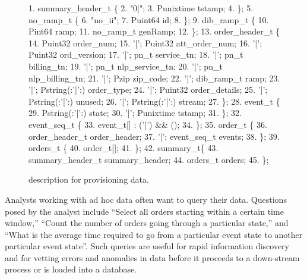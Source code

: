 \begin{figure}
\begin{small}
\begin{code}
{ 1}.   summary\_header\_t \{
{ 2}.  "0|";
{ 3}.  Punixtime tstamp;
{ 4}. \};
\mbox{}
{ 5}.  no\_ramp\_t \{
{ 6}.  "no\_ii";
{ 7}.  Puint64 id;
{ 8}. \};
\mbox{}
{ 9}.  dib\_ramp\_t \{
{10}.   Pint64     ramp;
{11}.   no\_ramp\_t  genRamp;
{12}. \};
\mbox{}
{13}.  order\_header\_t \{
{14}.        Puint32             order\_num;
{15}.  '|';  Puint32             att\_order\_num;
{16}.  '|';  Puint32             ord\_version;
{17}.  '|';   pn\_t           service\_tn;
{18}.  '|';   pn\_t           billing\_tn;
{19}.  '|';   pn\_t           nlp\_service\_tn;
{20}.  '|';   pn\_t           nlp\_billing\_tn;
{21}.  '|';   Pzip           zip\_code;
{22}.  '|';  dib\_ramp\_t          ramp;
{23}.  '|';  Pstring(:'|':)      order\_type;
{24}.  '|';  Puint32             order\_details;
{25}.  '|';  Pstring(:'|':)      unused;
{26}.  '|';  Pstring(:'|':)      stream;
{27}. \};
\mbox{}
{28}.  event\_t \{
{29}.        Pstring(:'|':)    state;   
{30}.   '|'; Punixtime         tstamp;
{31}. \};
\mbox{}
{32}.  event\_seq\_t \{
{33}.   event\_t[] : ('|') && ();
{34}. \};
\mbox{}
{35}.   order\_t \{
{36}.        order\_header\_t  order\_header;
{37}.   '|'; event\_seq\_t     events;
{38}. \};
\mbox{}
{39}.  orders\_t \{
{40}.   order\_t[];
{41}. \};
\mbox{}
{42}.   summary\_t\{
{43}.   summary\_header\_t  summary\_header;
{44}.   orders\_t          orders;
{45}. \};
\end{code}
\end{small}
\caption{\pads{} description for \dibbler{} provisioning data.}
\label{figure:dibbler}
\end{figure}

Analysts working with ad hoc data often want to query their data.  
Questions posed by the \dibbler{} analyst include ``Select all
orders starting within a certain time window,'' ``Count the number of
orders going through a particular state,'' and ``What is the average
time required to go from a particular event state to another
particular event state''.  Such queries are useful for rapid
information discovery and for vetting errors and anomalies in data
before it proceeds to a down-stream process or is loaded into a 
database.

